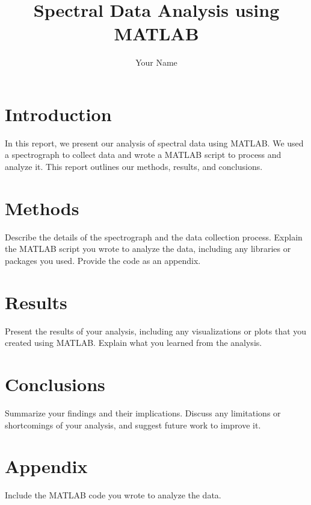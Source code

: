 \documentclass{article}
\title{Spectral Data Analysis using MATLAB}
\author{Your Name}
\begin{document}
\maketitle

\section{Introduction}
In this report, we present our analysis of spectral data using MATLAB. We used a spectrograph to collect data and wrote a MATLAB script to process and analyze it. This report outlines our methods, results, and conclusions.

\section{Methods}
Describe the details of the spectrograph and the data collection process. Explain the MATLAB script you wrote to analyze the data, including any libraries or packages you used. Provide the code as an appendix.

\section{Results}
Present the results of your analysis, including any visualizations or plots that you created using MATLAB. Explain what you learned from the analysis.

\section{Conclusions}
Summarize your findings and their implications. Discuss any limitations or shortcomings of your analysis, and suggest future work to improve it.

\section{Appendix}
Include the MATLAB code you wrote to analyze the data.
\end{document}

